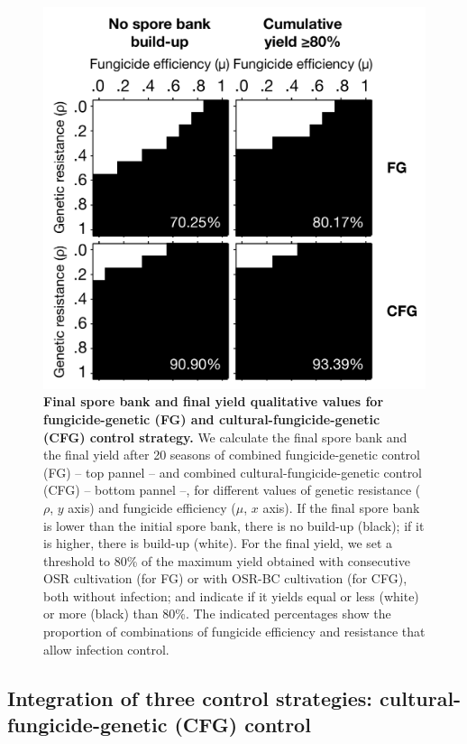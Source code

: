 \documentclass{article}
\begin{document}
 \begin{figure}
 \includegraphics[width=\columnwidth]{SCL_Fig/SCL_FigE.pdf}
\caption{\label{fig:figE}\textbf{Final spore bank and final yield qualitative values for fungicide-genetic (FG) and cultural-fungicide-genetic (CFG) control strategy.} We calculate the final spore bank and the final yield after 20 seasons of combined fungicide-genetic control (FG) -- top pannel -- and combined cultural-fungicide-genetic control (CFG) -- bottom pannel --, for different values of genetic resistance ($\rho$, $y$ axis) and fungicide efficiency ($\mu$, $x$ axis). If the final spore bank is lower than the initial spore bank, there is no build-up (black); if it is higher, there is build-up (white). For the final yield, we set a threshold to 80\% of the maximum yield obtained with consecutive OSR cultivation (for FG) or with OSR-BC cultivation (for CFG), both without infection; and indicate if it yields equal or less (white) or more (black) than 80\%. The indicated percentages show the proportion of combinations of fungicide efficiency and resistance that allow infection control.}
\end{figure}

\subsection{Integration of three control strategies: cultural-fungicide-genetic (CFG) control}
\end{document}
